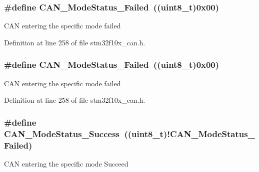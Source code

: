 \subsubsection[{\texorpdfstring{C\+A\+N\+\_\+\+Mode\+Status\+\_\+\+Failed}{CAN_ModeStatus_Failed}}]{\setlength{\rightskip}{0pt plus 5cm}\#define C\+A\+N\+\_\+\+Mode\+Status\+\_\+\+Failed~(({\bf uint8\+\_\+t})0x00)}\hypertarget{group___c_a_n___mode___status_ga9882944537945325ef08e1986838ea45}{}\label{group___c_a_n___mode___status_ga9882944537945325ef08e1986838ea45}
C\+AN entering the specific mode failed 

Definition at line 258 of file stm32f10x\+\_\+can.\+h.

\subsubsection[{\texorpdfstring{C\+A\+N\+\_\+\+Mode\+Status\+\_\+\+Failed}{CAN_ModeStatus_Failed}}]{\setlength{\rightskip}{0pt plus 5cm}\#define C\+A\+N\+\_\+\+Mode\+Status\+\_\+\+Failed~(({\bf uint8\+\_\+t})0x00)}\hypertarget{group___c_a_n___mode___status_ga9882944537945325ef08e1986838ea45}{}\label{group___c_a_n___mode___status_ga9882944537945325ef08e1986838ea45}
C\+AN entering the specific mode failed 

Definition at line 258 of file stm32f10x\+\_\+can.\+h.

\subsubsection[{\texorpdfstring{C\+A\+N\+\_\+\+Mode\+Status\+\_\+\+Success}{CAN_ModeStatus_Success}}]{\setlength{\rightskip}{0pt plus 5cm}\#define C\+A\+N\+\_\+\+Mode\+Status\+\_\+\+Success~(({\bf uint8\+\_\+t})!{\bf C\+A\+N\+\_\+\+Mode\+Status\+\_\+\+Failed})}\hypertarget{group___c_a_n___mode___status_ga7ca0ea503eb3b3a7c0abdfad27cb6579}{}\label{group___c_a_n___mode___status_ga7ca0ea503eb3b3a7c0abdfad27cb6579}
C\+AN entering the specific mode Succeed 

